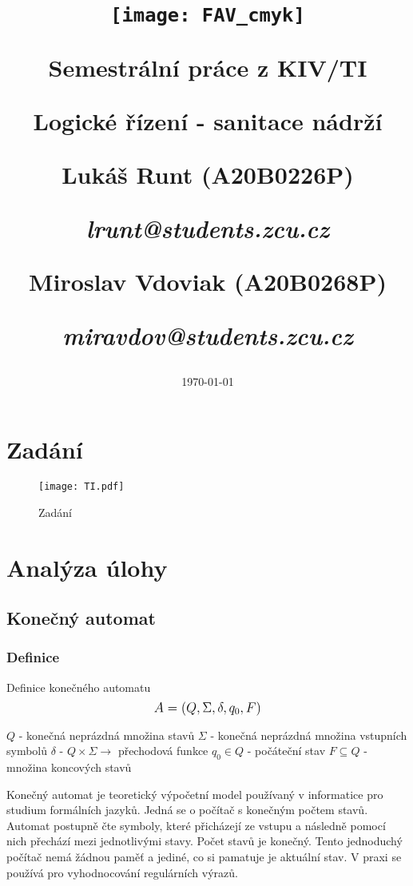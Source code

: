 \documentclass[12pt, a4paper]{article}
\title{\texttt{[image: FAV\_cmyk]}

{\huge Semestrální práce z KIV/TI}

\vspace{0.5cm}
{\LARGE Logické řízení - sanitace nádrží}
\vspace{1cm} 

\Large Lukáš Runt (A20B0226P)

\large {\itshape lrunt@students.zcu.cz}

\vspace{0.1cm}
\Large Miroslav Vdoviak (A20B0268P)

\large \itshape{miravdov@students.zcu.cz}
}
\date{\vspace{6cm} \today}
\begin{document}
\begin{titlepage}
\clearpage\maketitle
\thispagestyle{empty}
\end{titlepage}

\tableofcontents

\section{Zadání}
\begin{figure}[H]
    \centering
    \texttt{[image: TI.pdf]}
    \caption{Zadání}
    \label{obr1: Zadání}
\end{figure}

\section{Analýza úlohy}
\subsection{Konečný automat}
\subsubsection{Definice}

\noindent Definice konečného automatu
\[
    \mathlarger{A = (Q, \Sigma, \delta , q_0, F)} 
\]

\noindent$Q$ - konečná neprázdná množina stavů \newline
$\Sigma$ - konečná neprázdná množina vstupních symbolů \newline
$\delta$ - $Q \times \Sigma \rightarrow $ přechodová funkce \newline
$q_0 \in Q $ - počáteční stav \newline
$F\subseteq Q $ - množina koncových stavů \newline

Konečný automat je teoretický výpočetní model používaný v informatice pro studium formálních jazyků. Jedná se o počítač s konečným počtem stavů.
Automat postupně čte symboly, které přicházejí ze vstupu a následně pomocí nich přechází mezi jednotlivými stavy. Počet stavů je konečný. Tento jednoduchý počítač nemá žádnou paměť a jediné,
co si pamatuje je aktuální stav. V praxi se používá pro vyhodnocování regulárních výrazů.
\end{document}
